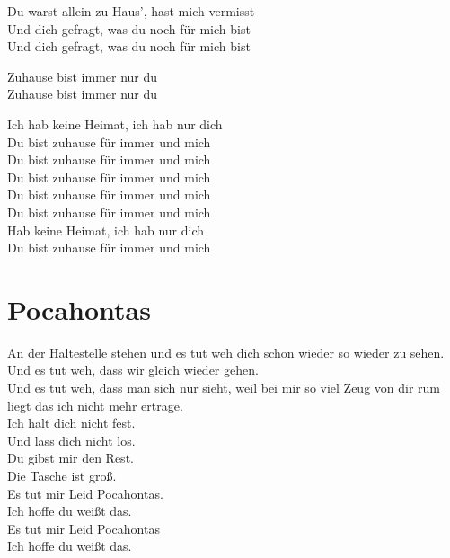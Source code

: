 \documentclass[]{book}
\begin{document}
Du warst allein zu Haus', hast mich vermisst\\
Und dich gefragt, was du noch für mich bist\\
Und dich gefragt, was du noch für mich bist

Zuhause bist immer nur du\\
Zuhause bist immer nur du

Ich hab keine Heimat, ich hab nur dich\\
Du bist zuhause für immer und mich\\
Du bist zuhause für immer und mich\\
Du bist zuhause für immer und mich\\
Du bist zuhause für immer und mich\\
Du bist zuhause für immer und mich\\
Hab keine Heimat, ich hab nur dich\\
Du bist zuhause für immer und mich

\hypertarget{pocahontas}{%
\section{Pocahontas}\label{pocahontas}}

An der Haltestelle stehen und es tut weh dich schon wieder so wieder zu sehen.\\
Und es tut weh, dass wir gleich wieder gehen.\\
Und es tut weh, dass man sich nur sieht, weil bei mir so viel Zeug von dir rum liegt das ich nicht mehr ertrage.\\
Ich halt dich nicht fest.\\
Und lass dich nicht los.\\
Du gibst mir den Rest.\\
Die Tasche ist groß.\\
Es tut mir Leid Pocahontas.\\
Ich hoffe du weißt das.\\
Es tut mir Leid Pocahontas\\
Ich hoffe du weißt das.
\end{document}
